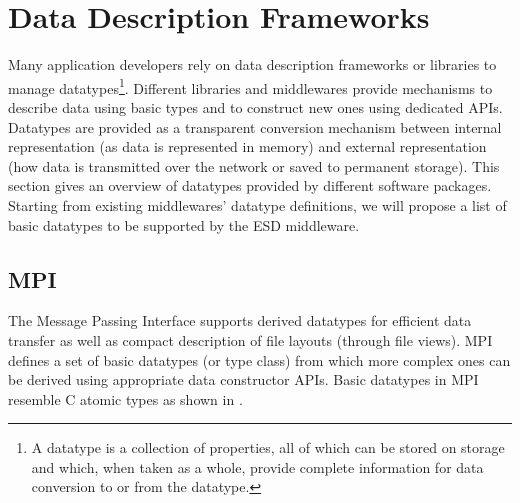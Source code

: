 \documentclass{../../template/esiwace-report}
\begin{document}
%
%
%
%
%
%

\section{Data Description Frameworks} \label{sec: data-formats}
Many application developers rely on data description frameworks or libraries to manage datatypes\footnote{A datatype is a collection of properties, all of which can be stored on storage and which, when taken as a whole, provide complete information for data conversion to or from the datatype.}. Different libraries and middlewares provide mechanisms to describe data using basic types and to construct new ones using dedicated APIs. Datatypes are provided as a transparent conversion mechanism between internal representation (as data is represented in memory) and external representation (how data is transmitted over the network or saved to permanent storage). This section gives an overview of datatypes provided by different software packages. 
Starting from existing middlewares' datatype definitions, we will propose a list of basic datatypes to be supported by the ESD middleware.


\subsection{MPI}
The Message Passing Interface supports derived datatypes for efficient data transfer as well as compact description of file layouts (through file views). MPI defines a set of basic datatypes (or type class) from which more complex ones can be derived using appropriate data constructor APIs. Basic datatypes in MPI resemble C atomic types as shown in .
\end{document}
